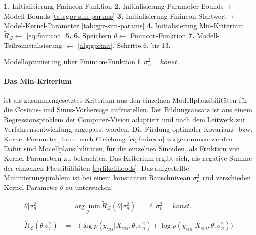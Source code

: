 \begin{algorithm}[htp]
	\SetAlgoLined
	\textbf{1.} Initialisierung Fmincon-Funktion\;
	\textbf{2.} Initialisierung Parameter-Bounds $\leftarrow$ Modell-Bounds \autoref{tab:gpr-sim-params}\;
	\textbf{3.} Initialisierung Fmincon-Startwert $\leftarrow$ Model-Kernel-Parameter \autoref{tab:gpr-sim-params}\;
	\textbf{4.} Initialisierung Min-Kriterium $\tilde{R}_{\mathcal{L}} \leftarrow$ \autoref{eq:fmincon}\;
	\textbf{5.} 
	\textbf{6.} Speichern $\theta \leftarrow$ Fmincon-Funktion\;
	\textbf{7.} Modell-Teilreinitialisierung $\leftarrow$ \autoref{alg:gprinit}, Schritte 6. bis 13.\;
	\caption{Modelloptimierung über Fmincon-Funktion f. $\sigma_n^2 = konst.$}
	\label{alg:fminconopt}
\end{algorithm}


\clearpage


\paragraph*{Das Min-Kriterium} ist als zusammengesetztes Kriterium aus den einzelnen Modellplausibilitäten für die Cosinus- und Sinus-Vorhersage aufzustellen. Der Bildungsansatz ist aus einem Regressionsproblem der Computer-Vision \cite{Guerrero2014} adaptiert und nach dem Leitwerk zur Verfahrensentwicklung \cite{Rasmussen2006} angepasst worden. Die Findung optimaler Kovarianz- bzw. Kernel-Parameter, kann nach Gleichung \autoref{eq:fmincon} vorgenommen werden. Dafür sind Modellplausibilitäten, für die einzelnen Sinoiden, als Funktion von Kernel-Parametern zu betrachten. Das Kriterium ergibt sich, als negative Summe der einzelnen Plausibilitäten \autoref{eq:likelihoods}. Das aufgestellte Minimierungsproblem ist bei einem konstanten Rauschniveau $\sigma_n^2$ und verschieden Kernel-Parameter $\theta$ zu untersuchen.


\begin{align}\label{eq:fmincon}
\theta|\sigma_n^2 &= \underset{\theta}{\arg\min} \tilde{R}_{\mathcal{L}}(\theta|\sigma_n^2) \qquad \text{f. } \sigma_n^2 = konst. \nonumber \\
\\
\tilde{R}_{\mathcal{L}}(\theta|\sigma_n^2) &= -\big( \log p(y_{cos}|X_{cos}, \theta, \sigma_n^2) + \log p(y_{sin}|X_{sin}, \theta, \sigma_n^2) \big) \nonumber
\end{align}


